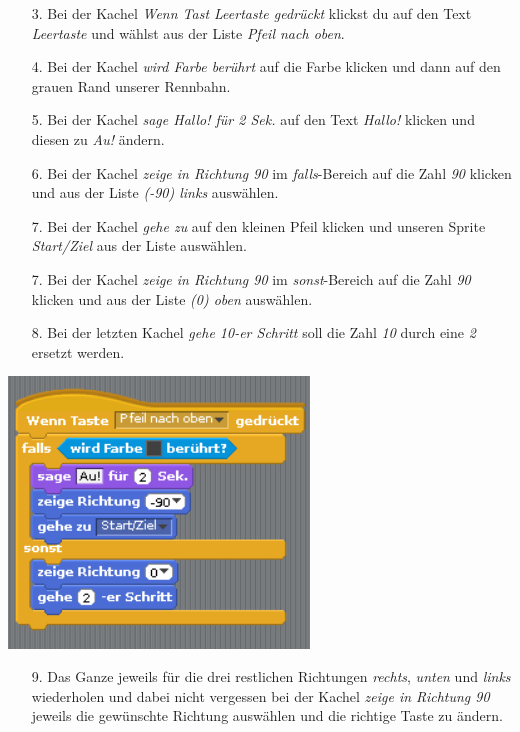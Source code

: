 \begin{itemize}
\item[3. ] Bei der Kachel \textit{Wenn Tast Leertaste gedr{\"u}ckt} klickst du auf den Text \textit{Leertaste} und w{\"a}hlst aus der Liste \textit{Pfeil nach oben}.
\item[4. ] Bei der Kachel \textit{wird Farbe ber{\"u}hrt} auf die Farbe klicken und dann auf den grauen Rand unserer Rennbahn.
\item[5. ] Bei der Kachel \textit{sage Hallo! f{\"u}r 2 Sek.} auf den Text \textit{Hallo!} klicken und diesen zu \textit{Au!} {\"a}ndern.
\item[6. ] Bei der Kachel \textit{zeige in Richtung 90} im \textit{falls}-Bereich auf die Zahl \textit{90} klicken und aus der Liste \textit{(-90) links} ausw{\"a}hlen.
\item[7. ] Bei der Kachel \textit{gehe zu} auf den kleinen Pfeil klicken und unseren Sprite \textit{Start/Ziel} aus der Liste ausw\"ahlen.
\item[7. ] Bei der Kachel \textit{zeige in Richtung 90} im \textit{sonst}-Bereich auf die Zahl \textit{90} klicken und aus der Liste \textit{(0) oben} ausw{\"a}hlen.
\item[8. ] Bei der letzten Kachel \textit{gehe 10-er Schritt} soll die Zahl \textit{10} durch eine \textit{2} ersetzt werden.
\end{itemize}
\includegraphics[width=0.6\textwidth]{images/aufgabe4_bewege_katze_nach_oben.png}

\begin{itemize}
\item[9. ] Das Ganze jeweils f{\"u}r die drei restlichen Richtungen \textit{rechts}, \textit{unten} und \textit{links} wiederholen und dabei nicht vergessen bei der Kachel \textit{zeige in Richtung 90} jeweils die gew{\"u}nschte Richtung ausw{\"a}hlen und die richtige Taste zu \"andern.
\end{itemize}

